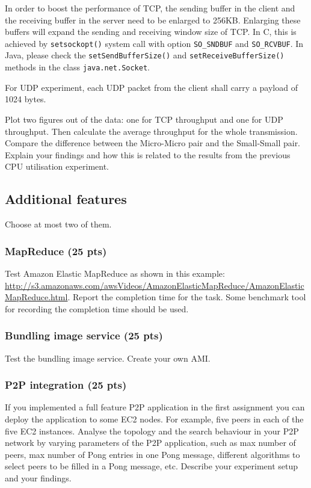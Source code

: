 \documentclass[12pt, a4paper]{article}
\begin{document}
In order to boost the performance of TCP, the sending buffer in the client and the receiving buffer in the server need to be enlarged to 256KB.
Enlarging these buffers will expand the sending and receiving window size of TCP.
In C, this is achieved by \texttt{setsockopt()} system call with option \texttt{SO\_SNDBUF} and \texttt{SO\_RCVBUF}.
In Java, please check the \texttt{setSendBufferSize()} and \texttt{setReceiveBufferSize()} methods in the class \texttt{java.net.Socket}.

For UDP experiment, each UDP packet from the client shall carry a payload of 1024 bytes.

Plot two figures out of the data: one for TCP throughput and one for UDP throughput.
Then calculate the average throughput for the whole transmission.
Compare the difference between the Micro-Micro pair and the Small-Small pair.
Explain your findings and how this is related to the results from the previous CPU utilisation experiment.


\subsection{Additional features}
Choose at most two of them.

\subsubsection{MapReduce (25 pts)}
Test Amazon Elastic MapReduce as shown in this example: \url{http://s3.amazonaws.com/awsVideos/AmazonElasticMapReduce/AmazonElasticMapReduce.html}.
Report the completion time for the task.
Some benchmark tool for recording the completion time should be used.

\subsubsection{Bundling image service (25 pts)}
Test the bundling image service.
Create your own AMI.

\subsubsection{P2P integration (25 pts)}
If you implemented a full feature P2P application in the first assignment you can deploy the application to some EC2 nodes.
For example, five peers in each of the five EC2 instances.
Analyse the topology and the search behaviour in your P2P network by varying parameters of the P2P application, such as max number of peers, max number of Pong entries in one Pong message, different algorithms to select peers to be filled in a Pong message, etc.
Describe your experiment setup and your findings.
\end{document}

